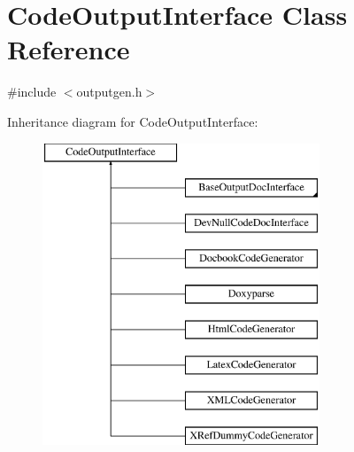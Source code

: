 \hypertarget{class_code_output_interface}{}\section{Code\+Output\+Interface Class Reference}
\label{class_code_output_interface}


{\ttfamily \#include $<$outputgen.\+h$>$}

Inheritance diagram for Code\+Output\+Interface\+:\begin{figure}[H]
\begin{center}
\leavevmode
\includegraphics[height=9.000000cm]{class_code_output_interface}
\end{center}
\end{figure}
